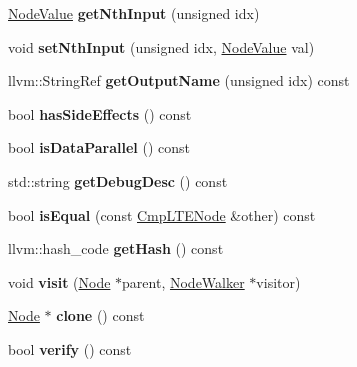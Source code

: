 \begin{DoxyCompactItemize}
\item 
\mbox{\label{classglow_1_1_cmp_l_t_e_node_ad243a121554dbf0a3c95b761161c2058}} 
\hyperlink{structglow_1_1_node_value}{Node\+Value} {\bfseries get\+Nth\+Input} (unsigned idx)
\item 
\mbox{\label{classglow_1_1_cmp_l_t_e_node_a2cb506cee6fe3959212db734f41e216f}} 
void {\bfseries set\+Nth\+Input} (unsigned idx, \hyperlink{structglow_1_1_node_value}{Node\+Value} val)
\item 
\mbox{\label{classglow_1_1_cmp_l_t_e_node_a76a1d83ee4145dd8318fb6763afc7a13}} 
llvm\+::\+String\+Ref {\bfseries get\+Output\+Name} (unsigned idx) const
\item 
\mbox{\label{classglow_1_1_cmp_l_t_e_node_aac804addfaa4db9c56d38b87bbd8ddaa}} 
bool {\bfseries has\+Side\+Effects} () const
\item 
\mbox{\label{classglow_1_1_cmp_l_t_e_node_acc619419564c316a91ee13487e744b50}} 
bool {\bfseries is\+Data\+Parallel} () const
\item 
\mbox{\label{classglow_1_1_cmp_l_t_e_node_acbe09f8500c3fb414abb1919eacce1d7}} 
std\+::string {\bfseries get\+Debug\+Desc} () const
\item 
\mbox{\label{classglow_1_1_cmp_l_t_e_node_a7fa423d9406756541d4f4de0970a1591}} 
bool {\bfseries is\+Equal} (const \hyperlink{classglow_1_1_cmp_l_t_e_node}{Cmp\+L\+T\+E\+Node} \&other) const
\item 
\mbox{\label{classglow_1_1_cmp_l_t_e_node_ada6d1b9aa4753999d17fa06f9427cb20}} 
llvm\+::hash\+\_\+code {\bfseries get\+Hash} () const
\item 
\mbox{\label{classglow_1_1_cmp_l_t_e_node_a01031c2ea066342939e1490a961c1d28}} 
void {\bfseries visit} (\hyperlink{classglow_1_1_node}{Node} $\ast$parent, \hyperlink{classglow_1_1_node_walker}{Node\+Walker} $\ast$visitor)
\item 
\mbox{\label{classglow_1_1_cmp_l_t_e_node_a42e33e50e669426cde9084ebe128b6ad}} 
\hyperlink{classglow_1_1_node}{Node} $\ast$ {\bfseries clone} () const
\item 
\mbox{\label{classglow_1_1_cmp_l_t_e_node_a4ecbdcc4413faf4ce33f73400a99fb9c}} 
bool {\bfseries verify} () const
\end{DoxyCompactItemize}
